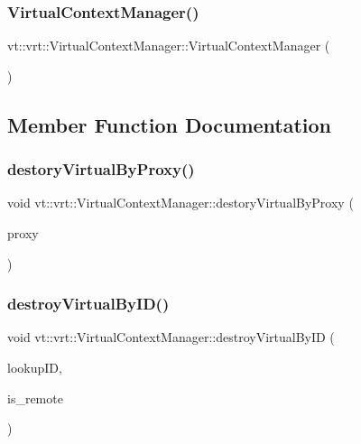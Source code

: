 \subsubsection{\texorpdfstring{Virtual\+Context\+Manager()}{VirtualContextManager()}}
{\footnotesize\ttfamily vt\+::vrt\+::\+Virtual\+Context\+Manager\+::\+Virtual\+Context\+Manager (\begin{DoxyParamCaption}{ }\end{DoxyParamCaption})}



\subsection{Member Function Documentation}
\mbox{\label{structvt_1_1vrt_1_1_virtual_context_manager_ae2e086766e9ce708e2e574d2cf59975b}} 
\subsubsection{\texorpdfstring{destory\+Virtual\+By\+Proxy()}{destoryVirtualByProxy()}}
{\footnotesize\ttfamily void vt\+::vrt\+::\+Virtual\+Context\+Manager\+::destory\+Virtual\+By\+Proxy (\begin{DoxyParamCaption}\item[{\hyperlink{namespacevt_a1b417dd5d684f045bb58a0ede70045ac}{Virtual\+Proxy\+Type} const \&}]{proxy }\end{DoxyParamCaption})}

\mbox{\label{structvt_1_1vrt_1_1_virtual_context_manager_a00ec944a1360a3f4a13ecfe965c22b36}} 
\subsubsection{\texorpdfstring{destroy\+Virtual\+By\+I\+D()}{destroyVirtualByID()}}
{\footnotesize\ttfamily void vt\+::vrt\+::\+Virtual\+Context\+Manager\+::destroy\+Virtual\+By\+ID (\begin{DoxyParamCaption}\item[{\hyperlink{namespacevt_1_1vrt_a84d0891f52f70728c3fc2172cffb464b}{Virtual\+I\+D\+Type} const \&}]{lookup\+ID,  }\item[{bool const}]{is\+\_\+remote }\end{DoxyParamCaption})\hspace{0.3cm}{\ttfamily [private]}}


